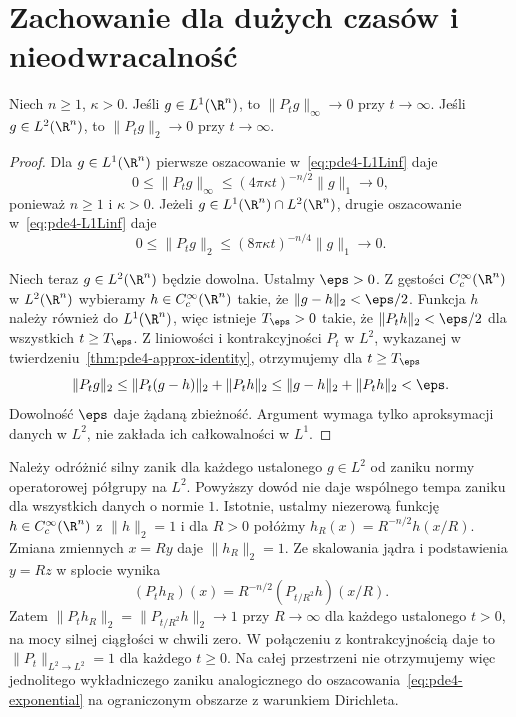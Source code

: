 \section{Zachowanie dla dużych czasów i nieodwracalność}
\label{sec:pde4-large-time}

\begin{twierdzenie}
\label{thm:pde4-large-time}
Niech $n\geq1$, $\kappa>0$.
Jeśli $g\in L^1(\R^n)$, to $\|P_tg\|_\infty\to0$
przy $t\to\infty$.
Jeśli $g\in L^2(\R^n)$, to $\|P_tg\|_2\to0$
przy $t\to\infty$.
\end{twierdzenie}
\begin{proof}
Dla $g\in L^1(\R^n)$ pierwsze oszacowanie
w~\eqref{eq:pde4-L1Linf} daje
\[
 0\leq\|P_tg\|_\infty\leq
 (4\pi\kappa t)^{-n/2}\|g\|_1\longrightarrow0,
\]
ponieważ $n\geq1$ i $\kappa>0$.
Jeżeli $g\in L^1(\R^n)\cap L^2(\R^n)$, drugie
oszacowanie w~\eqref{eq:pde4-L1Linf} daje
\[
 0\leq\|P_tg\|_2\leq
 (8\pi\kappa t)^{-n/4}\|g\|_1\longrightarrow0.
\]

Niech teraz $g\in L^2(\R^n)$ będzie dowolna.
Ustalmy $\eps>0$. Z gęstości $C_c^\infty(\R^n)$
w $L^2(\R^n)$ wybieramy $h\in C_c^\infty(\R^n)$
takie, że $\|g-h\|_2<\eps/2$.
Funkcja $h$ należy również do $L^1(\R^n)$,
więc istnieje $T_\eps>0$ takie, że
$\|P_th\|_2<\eps/2$ dla wszystkich $t\geq T_\eps$.
Z liniowości i kontrakcyjności $P_t$ w $L^2$,
wykazanej w twierdzeniu~\ref{thm:pde4-approx-identity},
otrzymujemy dla $t\geq T_\eps$
\[
 \|P_tg\|_2
 \leq\|P_t(g-h)\|_2+\|P_th\|_2
 \leq\|g-h\|_2+\|P_th\|_2<\eps.
\]
Dowolność $\eps$ daje żądaną zbieżność.
Argument wymaga tylko aproksymacji danych w $L^2$,
nie zakłada ich całkowalności w $L^1$.
\end{proof}

Należy odróżnić silny zanik dla każdego ustalonego
$g\in L^2$ od zaniku normy operatorowej półgrupy
na $L^2$. Powyższy dowód nie daje wspólnego tempa
zaniku dla wszystkich danych o normie $1$.
Istotnie, ustalmy niezerową funkcję
$h\in C_c^\infty(\R^n)$ z $\|h\|_2=1$ i dla $R>0$
połóżmy $h_R(x)=R^{-n/2}h(x/R)$.
Zmiana zmiennych $x=Ry$ daje $\|h_R\|_2=1$.
Ze skalowania jądra i podstawienia $y=Rz$ w splocie
wynika
\[
 (P_th_R)(x)=R^{-n/2}(P_{t/R^2}h)(x/R).
\]
Zatem $\|P_th_R\|_2=\|P_{t/R^2}h\|_2\to1$
przy $R\to\infty$ dla każdego ustalonego $t>0$,
na mocy silnej ciągłości w chwili zero.
W połączeniu z kontrakcyjnością daje to
$\|P_t\|_{L^2\to L^2}=1$ dla każdego $t\geq0$.
Na całej przestrzeni nie otrzymujemy więc
jednolitego wykładniczego zaniku analogicznego
do oszacowania~\eqref{eq:pde4-exponential}
na ograniczonym obszarze z warunkiem Dirichleta.

